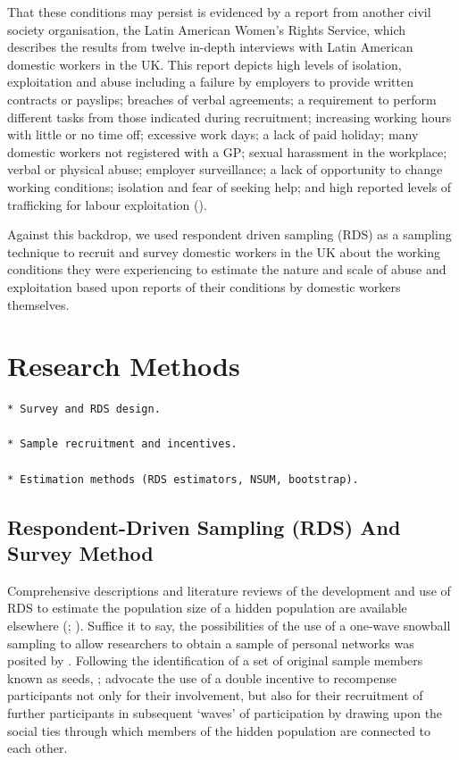 \documentclass[
  12pt,
  letterpaper,
  DIV=11,
  numbers=noendperiod]{scrartcl}
\theoremstyle{plain}
\theoremstyle{definition}
\begin{document}
That these conditions may persist is evidenced by a report from another
civil society organisation, the Latin American Women's Rights Service,
which describes the results from twelve in-depth interviews with Latin
American domestic workers in the UK. This report depicts high levels of
isolation, exploitation and abuse including a failure by employers to
provide written contracts or payslips; breaches of verbal agreements; a
requirement to perform different tasks from those indicated during
recruitment; increasing working hours with little or no time off;
excessive work days; a lack of paid holiday; many domestic workers not
registered with a GP; sexual harassment in the workplace; verbal or
physical abuse; employer surveillance; a lack of opportunity to change
working conditions; isolation and fear of seeking help; and high
reported levels of trafficking for labour exploitation
(\textcite{latin_american_womens_rights_service_behind_2023}).

Against this backdrop, we used respondent driven sampling (RDS) as a
sampling technique to recruit and survey domestic workers in the UK
about the working conditions they were experiencing to estimate the
nature and scale of abuse and exploitation based upon reports of their
conditions by domestic workers themselves.

\section{Research Methods}\label{research-methods}

\begin{verbatim}
* Survey and RDS design.
    
* Sample recruitment and incentives.
    
* Estimation methods (RDS estimators, NSUM, bootstrap).
\end{verbatim}

\subsection{Respondent-Driven Sampling (RDS) And Survey
Method}\label{respondent-driven-sampling-rds-and-survey-method}

Comprehensive descriptions and literature reviews of the development and
use of RDS to estimate the population size of a hidden population are
available elsewhere (\textcite{heckathorn_comment_2011};
\textcite{gile_methods_2018}). Suffice it to say, the possibilities of
the use of a one-wave snowball sampling to allow researchers to obtain a
sample of personal networks was posited by
\textcite{frank_estimating_1994}. Following the identification of a set
of original sample members known as seeds,
\textcite{heckathorn_respondent-driven_1997};
\textcite{heckathorn_respondent-driven_2002} advocate the use of a
double incentive to recompense participants not only for their
involvement, but also for their recruitment of further participants in
subsequent `waves' of participation by drawing upon the social ties
through which members of the hidden population are connected to each
other.
\end{document}
